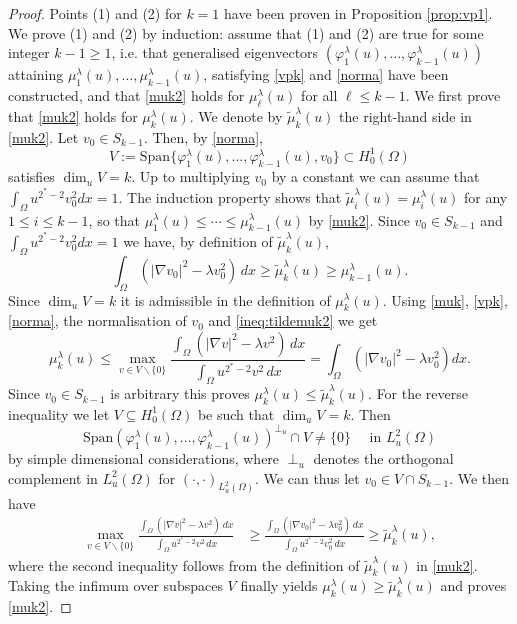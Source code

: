 \documentclass[10pt]{amsart}
\numberwithin{equation}{section}
\newcommand{\vp}{\varphi}
\newcommand{\Om}{\Omega}
\newcommand{\mkl}{\mu_{k}^{\lambda}}
\theoremstyle{plain}
\theoremstyle{remark}
\begin{document}
\begin{proof}
Points (1) and (2) for $k=1$ have been proven in Proposition \ref{prop:vp1}. We prove (1) and (2) by induction: assume that (1) and (2) are true for some integer $k-1 \ge 1$, i.e. that generalised eigenvectors $(\vp_{1}^\lambda(u), \dots, \varphi_{k-1}^{\lambda}(u))$ attaining $\mu_{1}^{\lambda}(u), \dots, \mu_{k-1}^{\lambda}(u)$, satisfying \eqref{vpk} and \eqref{norma} have been constructed, and that \eqref{muk2} holds for $\mu_{\ell}^{\lambda}(u)$ for all $\ell \le k-1$. We first prove that \eqref{muk2} holds for $\mkl(u)$. We denote by $\tilde{\mu}_{k}^{\lambda}(u)$ the right-hand side in \eqref{muk2}. Let $v_0 \in S_{k-1}$. Then, by \eqref{norma},
$$ V := \text{Span} \Big \{ \vp_{1}^{\lambda}(u), \dots, \varphi_{k-1}^{\lambda}(u), v_0 \Big \} \subset H^1_0(\Om)$$
 satisfies $\dim_u V = k$. Up to multiplying $v_0$ by a constant we can assume that $\int_\Om u^{2^*-2} v_0^2 dx = 1$. The induction property shows that $\tilde{\mu}_{i}^{\lambda}(u) = \mu_{i}^{\lambda}(u)$ for any $1 \le i \le k-1$, so that $ \mu_1^{\lambda}(u)  \le \cdots \le  \mu_{k-1}^{\lambda}(u)$ by \eqref{muk2}. Since $v_0 \in S_{k-1}$ and $\int_\Om u^{2^*-2} v_0^2 dx = 1$ we have, by definition of $\tilde{\mu}_{k}^{\lambda}(u)$,
\begin{equation} \label{ineq:tildemuk2} 
 \int_{\Om}\left(  |\nabla v_0|^2 - \lambda v_0^2 \right) \, dx \ge \tilde{\mu}_{k}^{\lambda}(u) \ge \mu_{k-1}^{\lambda}(u). 
 \end{equation}
 Since $\dim_u V = k$ it is admissible in the definition of $\mkl(u)$. Using \eqref{muk}, \eqref{vpk}, \eqref{norma}, the normalisation of $v_0$ and \eqref{ineq:tildemuk2} we get 
 $$ \mkl(u) \le \max_{v \in V \backslash \{0\}} \frac{\int_{\Om}\left(  |\nabla v|^2 - \lambda v^2 \right) \, dx}{\int_{\Om} u^{2^*-2} v^2 \, dx}  = \int_{\Om}\left(  |\nabla v_0|^2 - \lambda v_0^2 \right)dx . $$
 Since $v_0 \in S_{k-1}$ is arbitrary this proves $ \mu_{k}^{\lambda}(u)  \le \tilde{\mu}_{k}^{\lambda}(u)$. For the reverse inequality we let $V \subseteq H^1_0(\Om)$ be such that $\dim_u V = k$. Then 
 $$\text{Span}( \vp_{1}^{\lambda}(u), \dots, \varphi_{k-1}^{\lambda}(u))^{\perp_u} \cap V \neq \{ 0\} \quad \text{ in } L^2_u(\Om)$$
 by simple dimensional considerations, where $\perp_u$ denotes the orthogonal complement in $L^2_u(\Om)$ for $(\cdot, \cdot)_{L^2_u(\Om)}$. We can thus let $v_0 \in V \cap S_{k-1}$. We then have
$$\begin{aligned}  \max_{ v \in V \backslash \{0\}}  \frac{\int_{\Om}\left(  |\nabla v|^2 - \lambda v^2 \right) \, dx}{\int_{\Om} u^{2^*-2} v^2 \, dx}  & \ge \frac{\int_{\Om}\left(  |\nabla v_0|^2 - \lambda v_0^2 \right) \, dx}{\int_{\Om} u^{2^*-2} v_0^2 \, dx}  \ge \tilde{\mu}_{k}^{\lambda}(u), 
\end{aligned} $$
where the second inequality follows from the definition of $\tilde{\mu}_{k}^{\lambda}(u)$ in \eqref{muk2}. Taking the infimum over subspaces $V$ finally yields $\mu_{k}^{\lambda}(u) \ge \tilde{\mu}_{k}^{\lambda}(u)$ and proves \eqref{muk2}. 


\end{proof}
\end{document}
